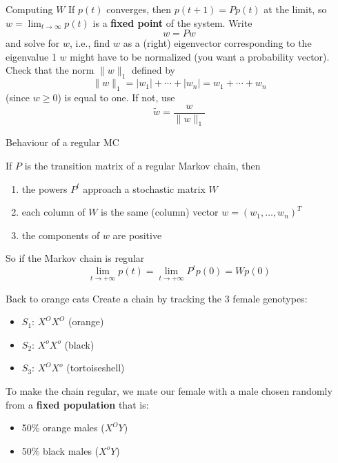 \documentclass[aspectratio=169]{beamer}\usepackage[]{graphicx}\usepackage[]{xcolor}
\begin{document}
\begin{frame}{Computing $W$}
If $p(t)$ converges, then $p(t+1)=Pp(t)$ at the limit, so $w=\lim_{t\to\infty}p(t)$ is a \textbf{fixed point} of the system. Write
\[
w=Pw
\]
and solve for $w$, i.e., find $w$ as a (right) eigenvector corresponding to the eigenvalue 1
\vfill
$w$ might have to be normalized (you want a probability vector). Check that the norm $\|w\|_1$ defined by
\[
\|w\|_1=|w_1|+\cdots+|w_n|=w_1+\cdots+w_n
\]
(since $w\geq 0$) is equal to one. If not, use
\[
\tilde w = \frac{w}{\|w\|_1}
\]
\end{frame}

\begin{frame}{Behaviour of a regular MC}
\begin{theorem}
If $P$ is the transition matrix of a regular Markov chain, then
\begin{enumerate}
\item the powers $P^t$ approach a stochastic matrix $W$
\item each column of $W$ is the same (column) vector $w=(w_1,\ldots,w_n)^T$
\item the components of $w$ are positive
\end{enumerate}
\end{theorem}
\vfill
So if the Markov chain is regular
\[
\lim_{t\rightarrow +\infty}p(t)=\lim_{t\rightarrow +\infty}P^tp(0)
=Wp(0)
\]
\end{frame}


\begin{frame}{Back to orange cats}
     Create a chain by tracking the 3 female genotypes:
    \begin{itemize}
        \item $S_1$: $X^O X^O$ (orange)
        \item $S_2$: $X^o X^o$ (black)
        \item $S_3$: $X^O X^o$ (tortoiseshell)
    \end{itemize}
    \vfill
    To make the chain regular, we mate our female with a male chosen randomly from a \textbf{fixed population} that is:
    \begin{itemize}
        \item 50\% orange males ($X^O Y$)
        \item 50\% black males ($X^o Y$)
    \end{itemize}
\end{frame}
\end{document}

